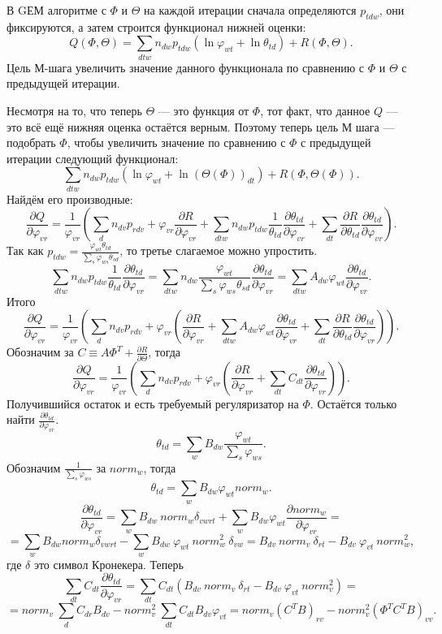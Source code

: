 \documentclass[12pt]{article}
\renewcommand{\phi}{\varphi}
\begin{document}
В GЕМ алгоритме с $\Phi$ и $\Theta$ на каждой итерации сначала определяются $p_{tdw}$, они фиксируются, а затем строится функционал нижней оценки: 
\[
Q(\Phi, \Theta) = \sum_{dtw} n_{dw} p_{tdw} \left( \ln \phi_{wt} + \ln \theta_{td}\right) + R(\Phi, \Theta).
\]
Цель М-шага увеличить значение данного функционала по сравнению с $\Phi$ и $\Theta$ с предыдущей итерации.

Несмотря на то, что теперь $\Theta$ --- это функция от $\Phi$, тот факт, что данное $Q$ --- это всё ещё нижняя оценка остаётся верным. Поэтому теперь цель М шага --- подобрать $\Phi$, чтобы увеличить значение по сравнению с $\Phi$ с предыдущей итерации следующий функционал: 
\[
\sum_{dtw} n_{dw} p_{tdw} \left( \ln \phi_{wt} + \ln (\Theta(\Phi))_{dt}\right) + R(\Phi, \Theta(\Phi)).
\]
Найдём его производные:
\[
\frac{\partial{Q}}{\partial{\phi_{vr}}} = \frac{1}{\phi_{vr}} \left( \sum_{d} n_{dv} p_{rdv} + \phi_{vr} \frac{\partial{R}}{\partial{\phi_{vr}}} + \sum_{dtw} n_{dw} p_{tdw} \frac{1}{\theta_{td}} \frac{\partial{\theta_{td}}}{\partial{\phi_{vr}}} +  \sum_{dt} \frac{\partial{R}}{\partial{\theta_{td}}} \frac{\partial{\theta_{td}}}{\partial{\phi_{vr}}} \right).
\]
Так как $p_{tdw} = \frac{\phi_{wt} \theta_{td}}{\sum_s \phi_{ws} \theta_{sd}}$, то третье слагаемое можно упростить.
\[
\sum_{dtw} n_{dw} p_{tdw} \frac{1}{\theta_{td}} \frac{\partial{\theta_{td}}}{\partial{\phi_{vr}}} = \sum_{dtw} n_{dw}\frac{\phi_{wt}}{\sum_s \phi_{ws} \theta_{sd}} \frac{\partial{\theta_{td}}}{\partial{\phi_{vr}}} = \sum_{dtw} A_{dw} \phi_{wt} \frac{\partial{\theta_{td}}}{\partial{\phi_{vr}}}.
\]
Итого
\[
\frac{\partial{Q}}{\partial{\phi_{vr}}} = \frac{1}{\phi_{vr}} \left( \sum_{d} n_{dv} p_{rdv} + \phi_{vr}\left( \frac{\partial{R}}{\partial{\phi_{vr}}} + \sum_{dtw} A_{dw} \phi_{wt} \frac{\partial{\theta_{td}}}{\partial{\phi_{vr}}} +  \sum_{dt} \frac{\partial{R}}{\partial{\theta_{td}}} \frac{\partial{\theta_{td}}}{\partial{\phi_{vr}}} \right) \right).
\]
Обозначим за $C \equiv A \Phi^T + \frac{\partial{R}}{\partial{\Theta}}$, тогда
\[
\frac{\partial{Q}}{\partial{\phi_{vr}}} = \frac{1}{\phi_{vr}} \left( \sum_{d} n_{dv} p_{rdv} + \phi_{vr}\left( \frac{\partial{R}}{\partial{\phi_{vr}}} + \sum_{dt} C_{dt} \frac{\partial{\theta_{td}}}{\partial{\phi_{vr}}} \right) \right).
\]
Получившийся остаток и есть требуемый регуляризатор на $\Phi$. Остаётся только найти $\frac{\partial{\theta_{td}}}{\partial{\phi_{vr}}}$.
\[
\theta_{td} = \sum_{w} B_{dw} \frac{\phi_{wt}}{\sum_s \phi_{ws}}.
\]
Обозначим $\frac{1}{\sum_s \phi_{ws}}$ за $norm_w$, тогда
\[
\theta_{td} = \sum_{w} B_{dw} \phi_{wt} norm_w.
\]
\[
\frac{\partial{\theta_{td}}}{\partial{\phi_{vr}}} =  \sum_{w} B_{dw}~norm_w \delta_{vwrt} +  \sum_{w} B_{dw} \phi_{wt} \frac{\partial{norm_w}}{\partial{\phi_{vr}}} = 
\]
\[
= \sum_{w} B_{dw} norm_w \delta_{vwrt} - \sum_{w} B_{dw}~\phi_{wt}~norm_w^2~\delta_{vw} =
B_{dv}~norm_v~\delta_{rt} - B_{dv}~\phi_{vt}~norm_w^2,
\]
где $\delta$ это символ Кронекера. Теперь
\[
\sum_{dt} C_{dt} \frac{\partial{\theta_{td}}}{\partial{\phi_{vr}}} = \sum_{dt} C_{dt} \left( B_{dv}~norm_v~\delta_{rt} - B_{dv}~\phi_{vt}~norm_v^2 \right) =  
\]
\[
= norm_v~\sum_d C_{dr} B_{dv} -  norm_v^2~\sum_{dt} C_{dt} B_{dv} \phi_{vt} = norm_v (C^T B)_{rv} - norm_v^2 (\Phi^T C^T B)_{vv}.
\]
\end{document}
